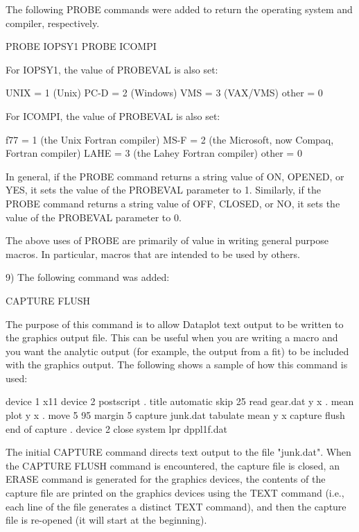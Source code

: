 {    The following PROBE commands were added to return the
    operating system and compiler, respectively.

        PROBE IOPSY1
        PROBE ICOMPI

    For IOPSY1, the value of PROBEVAL is also set:

        UNIX   = 1    (Unix)
        PC-D   = 2    (Windows)
        VMS    = 3    (VAX/VMS)
        other  = 0

    For ICOMPI, the value of PROBEVAL is also set:

        f77    = 1    (the Unix Fortran compiler)
        MS-F   = 2    (the Microsoft, now Compaq, Fortran compiler)
        LAHE   = 3    (the Lahey Fortran compiler)
        other  = 0

    In general, if the PROBE command returns a string value of ON,
    OPENED, or YES, it sets the value of the PROBEVAL parameter to 1.
    Similarly, if the PROBE command returns a string value of OFF,
    CLOSED, or NO, it sets the value of the PROBEVAL parameter to 0.

    The above uses of PROBE are primarily of value in writing
    general purpose macros.  In particular, macros that are intended
    to be used by others.

 9) The following command was added:

        CAPTURE FLUSH

    The purpose of this command is to allow Dataplot text output
    to be written to the graphics output file.  This can be useful
    when you are writing a macro and you want the analytic output
    (for example, the output from a fit) to be included with the
    graphics output.  The following shows a sample of how this
    command is used:

       device 1 x11
       device 2 postscript
       .
       title automatic
       skip 25
       read gear.dat y x
       .
       mean plot y x
       .
       move 5 95
       margin 5
       capture junk.dat
       tabulate mean y x
       capture flush
       end of capture
       .
       device 2 close
       system lpr dppl1f.dat

    The initial CAPTURE command directs text output to the
    file "junk.dat".  When the CAPTURE FLUSH command is
    encountered, the capture file is closed, an ERASE command
    is generated for the  graphics devices, the contents of
    the capture file are printed on the graphics devices using
    the TEXT command (i.e., each line of the file generates a
    distinct TEXT command), and then the capture file is re-opened
    (it will start at the beginning).

}

